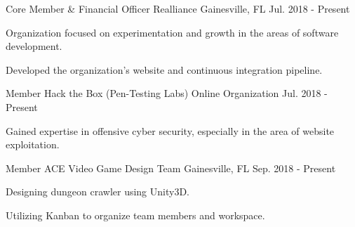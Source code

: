 \begin{cventries}
  \cventry
    {Core Member \& Financial Officer}
    {Realliance}
    {Gainesville, FL}
    {Jul. 2018 - Present}
    {
      \begin{cvitems}
        \item {Organization focused on experimentation and growth in the areas of software development.}
        \item {Developed the organization's website and continuous integration pipeline.}
      \end{cvitems}
    }
  \cventry
    {Member}
    {Hack the Box (Pen-Testing Labs)}
    {Online Organization}
    {Jul. 2018 - Present}
    {
      \begin{cvitems}
        \item {Gained expertise in offensive cyber security, especially in the area of website exploitation.}
      \end{cvitems}
    }
  \cventry
    {Member}
    {ACE Video Game Design Team}
    {Gainesville, FL}
    {Sep. 2018 - Present}
    {
      \begin{cvitems}
        \item {Designing dungeon crawler using Unity3D.}
        \item {Utilizing Kanban to organize team members and workspace.}
      \end{cvitems}
    }
\end{cventries}
